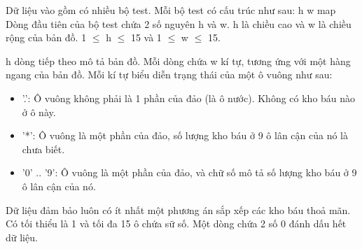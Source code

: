 Dữ liệu vào gồm có nhiều bộ test. Mỗi bộ test có cấu trúc như sau: h w map Dòng đầu tiên của bộ test chứa 2 số nguyên h và w. h là chiều cao và w là chiều rộng của bản đồ. 1 $\le$ h $\le$ 15 và 1 $\le$ w $\le$ 15.

h dòng tiếp theo mô tả bản đồ. Mỗi dòng chứa w kí tự, tương ứng với một hàng ngang của bản đồ. Mỗi kí tự biểu diễn trạng thái của một ô vuông như sau:
\begin{itemize}
	\item '.': Ô vuông không phải là 1 phần của đảo (là ô nước). Không có kho báu nào ở ô này.
	\item '*': Ô vuông là một phần của đảo, số lượng kho báu ở 9 ô lân cận của nó là chưa biết.
	\item '0' .. '9': Ô vuông là một phần của đảo, và chữ số mô tả số lượng kho báu ở 9 ô lân cận của nó.
\end{itemize}

Dữ liệu đảm bảo luôn có ít nhất một phương án sắp xếp các kho báu thoả mãn. Có tối thiểu là 1 và tối đa 15 ô chứa sữ số. Một dòng chứa 2 số 0 đánh dấu hết dữ liệu.
